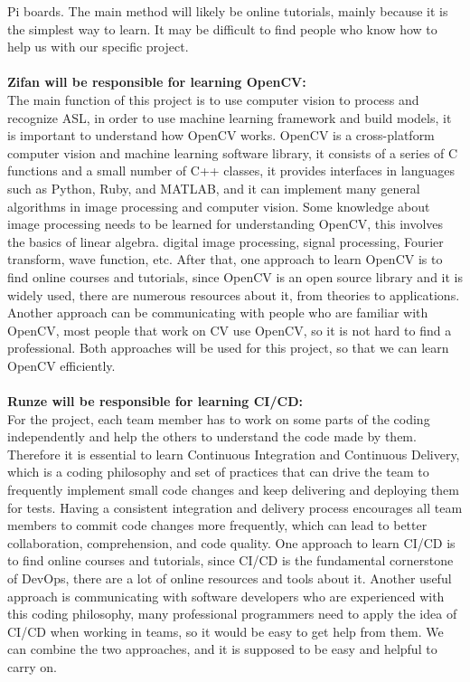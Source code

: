 \documentclass[12pt]{article}
\begin{document}
Pi boards. The main method will likely be online tutorials, mainly because it is the simplest way to learn. It may be difficult to find people
who know how to help us with our specific project.\\
~\\
\textbf{Zifan will be responsible for learning OpenCV:}\\
The main function of this project is to use computer vision to process and recognize ASL, in order to use machine learning framework and build models, it is important to 
understand how OpenCV works. OpenCV is a cross-platform computer vision and machine learning software library, it consists of a series of C functions and a small number of
C++ classes, it provides interfaces in languages such as Python, Ruby, and MATLAB, and it can implement many general algorithms in image processing and computer vision. 
Some knowledge about image processing needs to be learned for understanding OpenCV, this involves the basics of linear algebra. digital image processing, signal processing, 
Fourier transform, wave function, etc. After that, one approach to learn OpenCV is to find online courses and tutorials, since OpenCV is an open source library and it is
widely used, there are numerous resources about it, from theories to applications. Another approach can be communicating with people who are familiar with OpenCV, most 
people that work on CV use OpenCV, so it is not hard to find a professional. Both approaches will be used for this project, so that we can learn OpenCV efficiently.\\
~\\
\textbf{Runze will be responsible for learning CI/CD:}\\
For the project, each team member has to work on some parts of the coding independently and help the others to understand the code made by them. 
Therefore it is essential to learn Continuous Integration and Continuous Delivery, which is a coding philosophy and set of practices that can drive the team to frequently implement small code changes and keep delivering and deploying them for tests. 
Having a consistent integration and delivery process encourages all team members to commit code changes more frequently, which can lead to better collaboration, comprehension, and code quality. 
One approach to learn CI/CD is to find online courses and tutorials, since CI/CD is the fundamental cornerstone of DevOps, there are a lot of online resources and tools about it. 
Another useful approach is communicating with software developers who are experienced with this coding philosophy, many professional programmers need to apply the idea of CI/CD when working in teams, so it would be easy to get help from them.
We can combine the two approaches, and it is supposed to be easy and helpful to carry on.\\
\end{document}
